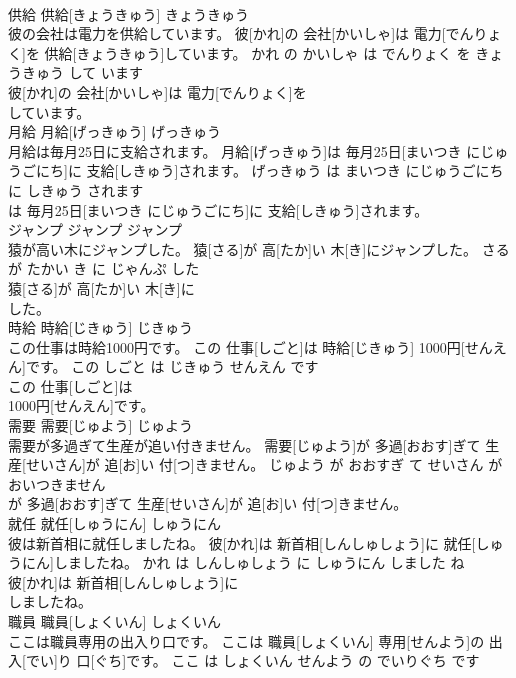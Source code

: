 \documentclass[8pt]{extreport}
\begin{document}
\begin{CJK}{UTF8}{min}
\\	供給	供給[きょうきゅう]	きょうきゅう	
\\	彼の会社は電力を供給しています。	彼[かれ]の 会社[かいしゃ]は 電力[でんりょく]を 供給[きょうきゅう]しています。	かれ の かいしゃ は でんりょく を きょうきゅう して います	
\\	彼[かれ]の 会社[かいしゃ]は 電力[でんりょく]を
\\	しています。			
\\	月給	月給[げっきゅう]	げっきゅう	
\\	月給は毎月25日に支給されます。	月給[げっきゅう]は 毎月25日[まいつき にじゅうごにち]に 支給[しきゅう]されます。	げっきゅう は まいつき にじゅうごにち に しきゅう されます	
\\	は 毎月25日[まいつき にじゅうごにち]に 支給[しきゅう]されます。			
\\	ジャンプ	ジャンプ	ジャンプ	
\\	猿が高い木にジャンプした。	猿[さる]が 高[たか]い 木[き]にジャンプした。	さる が たかい き に じゃんぷ した	
\\	猿[さる]が 高[たか]い 木[き]に
\\	した。			
\\	時給	時給[じきゅう]	じきゅう	
\\	この仕事は時給1000円です。	この 仕事[しごと]は 時給[じきゅう] 1000円[せんえん]です。	この しごと は じきゅう せんえん です	
\\	この 仕事[しごと]は
\\	1000円[せんえん]です。			
\\	需要	需要[じゅよう]	じゅよう	
\\	需要が多過ぎて生産が追い付きません。	需要[じゅよう]が 多過[おおす]ぎて 生産[せいさん]が 追[お]い 付[つ]きません。	じゅよう が おおすぎ て せいさん が おいつきません	
\\	が 多過[おおす]ぎて 生産[せいさん]が 追[お]い 付[つ]きません。			
\\	就任	就任[しゅうにん]	しゅうにん	
\\	彼は新首相に就任しましたね。	彼[かれ]は 新首相[しんしゅしょう]に 就任[しゅうにん]しましたね。	かれ は しんしゅしょう に しゅうにん しました ね	
\\	彼[かれ]は 新首相[しんしゅしょう]に
\\	しましたね。			
\\	職員	職員[しょくいん]	しょくいん	
\\	ここは職員専用の出入り口です。	ここは 職員[しょくいん] 専用[せんよう]の 出入[でい]り 口[ぐち]です。	ここ は しょくいん せんよう の でいりぐち です	

\end{CJK}
\end{document}
